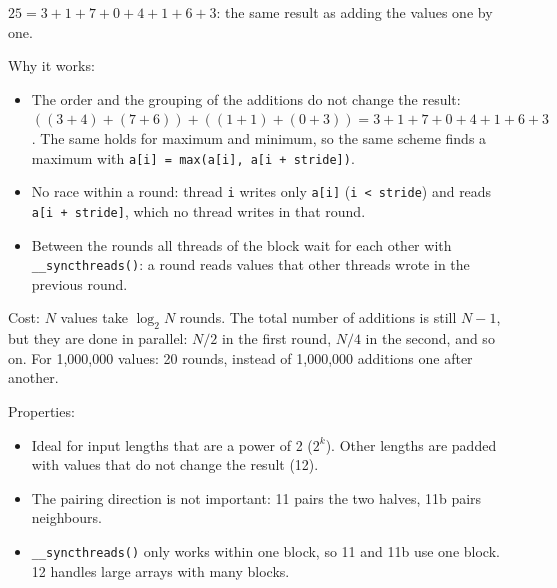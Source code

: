 \documentclass[main.tex]{subfiles}
\begin{document}
$25 = 3 + 1 + 7 + 0 + 4 + 1 + 6 + 3$: the same result as adding the values one by one.

Why it works:
\begin{itemize}[nosep]
  \item The order and the grouping of the additions do not change the result: $((3 + 4) + (7 + 6)) + ((1 + 1) + (0 + 3)) = 3 + 1 + 7 + 0 + 4 + 1 + 6 + 3$. The same holds for maximum and minimum, so the same scheme finds a maximum with \texttt{a[i] = max(a[i], a[i + stride])}.
  \item No race within a round: thread \texttt{i} writes only \texttt{a[i]} (\texttt{i < stride}) and reads \texttt{a[i + stride]}, which no thread writes in that round.
  \item Between the rounds all threads of the block wait for each other with \texttt{\_\_syncthreads()}: a round reads values that other threads wrote in the previous round.
\end{itemize}

Cost: $N$ values take $\log_2 N$ rounds. The total number of additions is still $N - 1$, but they are done in parallel: $N/2$ in the first round, $N/4$ in the second, and so on.
For 1,000,000 values: 20 rounds, instead of 1,000,000 additions one after another.

Properties:
\begin{itemize}[nosep]
  \item Ideal for input lengths that are a power of 2 ($2^k$). Other lengths are padded with values that do not change the result (12).
  \item The pairing direction is not important: 11 pairs the two halves, 11b pairs neighbours.
  \item \texttt{\_\_syncthreads()} only works within one block, so 11 and 11b use one block. 12 handles large arrays with many blocks.
\end{itemize}
\end{document}
